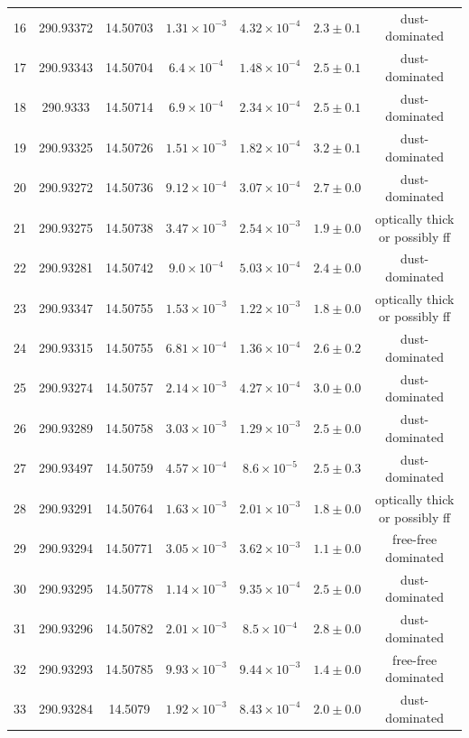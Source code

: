 \begin{table}
\begin{tabular}{ccccccc}
16 & 290.93372 & 14.50703 & $1.31\times10^{-3}$ & $4.32\times10^{-4}$ & $2.3\pm0.1$ & dust-dominated \\
17 & 290.93343 & 14.50704 & $6.4\times10^{-4}$ & $1.48\times10^{-4}$ & $2.5\pm0.1$ & dust-dominated \\
18 & 290.9333 & 14.50714 & $6.9\times10^{-4}$ & $2.34\times10^{-4}$ & $2.5\pm0.1$ & dust-dominated \\
19 & 290.93325 & 14.50726 & $1.51\times10^{-3}$ & $1.82\times10^{-4}$ & $3.2\pm0.1$ & dust-dominated \\
20 & 290.93272 & 14.50736 & $9.12\times10^{-4}$ & $3.07\times10^{-4}$ & $2.7\pm0.0$ & dust-dominated \\
21 & 290.93275 & 14.50738 & $3.47\times10^{-3}$ & $2.54\times10^{-3}$ & $1.9\pm0.0$ & optically thick or possibly ff \\
22 & 290.93281 & 14.50742 & $9.0\times10^{-4}$ & $5.03\times10^{-4}$ & $2.4\pm0.0$ & dust-dominated \\
23 & 290.93347 & 14.50755 & $1.53\times10^{-3}$ & $1.22\times10^{-3}$ & $1.8\pm0.0$ & optically thick or possibly ff \\
24 & 290.93315 & 14.50755 & $6.81\times10^{-4}$ & $1.36\times10^{-4}$ & $2.6\pm0.2$ & dust-dominated \\
25 & 290.93274 & 14.50757 & $2.14\times10^{-3}$ & $4.27\times10^{-4}$ & $3.0\pm0.0$ & dust-dominated \\
26 & 290.93289 & 14.50758 & $3.03\times10^{-3}$ & $1.29\times10^{-3}$ & $2.5\pm0.0$ & dust-dominated \\
27 & 290.93497 & 14.50759 & $4.57\times10^{-4}$ & $8.6\times10^{-5}$ & $2.5\pm0.3$ & dust-dominated \\
28 & 290.93291 & 14.50764 & $1.63\times10^{-3}$ & $2.01\times10^{-3}$ & $1.8\pm0.0$ & optically thick or possibly ff \\
29 & 290.93294 & 14.50771 & $3.05\times10^{-3}$ & $3.62\times10^{-3}$ & $1.1\pm0.0$ & free-free dominated \\
30 & 290.93295 & 14.50778 & $1.14\times10^{-3}$ & $9.35\times10^{-4}$ & $2.5\pm0.0$ & dust-dominated \\
31 & 290.93296 & 14.50782 & $2.01\times10^{-3}$ & $8.5\times10^{-4}$ & $2.8\pm0.0$ & dust-dominated \\
32 & 290.93293 & 14.50785 & $9.93\times10^{-3}$ & $9.44\times10^{-3}$ & $1.4\pm0.0$ & free-free dominated \\
33 & 290.93284 & 14.5079 & $1.92\times10^{-3}$ & $8.43\times10^{-4}$ & $2.0\pm0.0$ & dust-dominated \\

\end{tabular}
\end{table}
